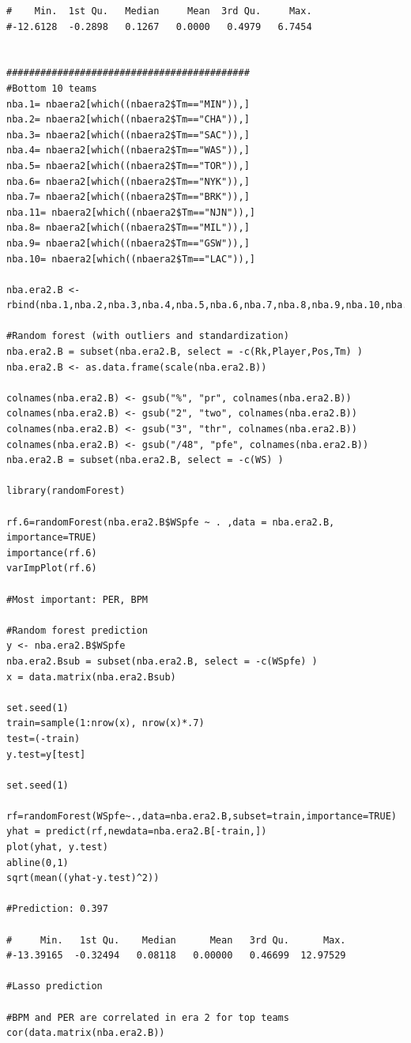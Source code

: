 \documentclass[11pt,letterpaper]{amsart}
\begin{document}
\begin{lstlisting}[breaklines]
#    Min.  1st Qu.   Median     Mean  3rd Qu.     Max. 
#-12.6128  -0.2898   0.1267   0.0000   0.4979   6.7454  


###########################################
#Bottom 10 teams
nba.1= nbaera2[which((nbaera2$Tm=="MIN")),]
nba.2= nbaera2[which((nbaera2$Tm=="CHA")),]
nba.3= nbaera2[which((nbaera2$Tm=="SAC")),]
nba.4= nbaera2[which((nbaera2$Tm=="WAS")),]
nba.5= nbaera2[which((nbaera2$Tm=="TOR")),]
nba.6= nbaera2[which((nbaera2$Tm=="NYK")),]
nba.7= nbaera2[which((nbaera2$Tm=="BRK")),]
nba.11= nbaera2[which((nbaera2$Tm=="NJN")),]
nba.8= nbaera2[which((nbaera2$Tm=="MIL")),]
nba.9= nbaera2[which((nbaera2$Tm=="GSW")),]
nba.10= nbaera2[which((nbaera2$Tm=="LAC")),]

nba.era2.B <- rbind(nba.1,nba.2,nba.3,nba.4,nba.5,nba.6,nba.7,nba.8,nba.9,nba.10,nba.11)

#Random forest (with outliers and standardization)
nba.era2.B = subset(nba.era2.B, select = -c(Rk,Player,Pos,Tm) )
nba.era2.B <- as.data.frame(scale(nba.era2.B))

colnames(nba.era2.B) <- gsub("%", "pr", colnames(nba.era2.B))
colnames(nba.era2.B) <- gsub("2", "two", colnames(nba.era2.B))
colnames(nba.era2.B) <- gsub("3", "thr", colnames(nba.era2.B))
colnames(nba.era2.B) <- gsub("/48", "pfe", colnames(nba.era2.B))
nba.era2.B = subset(nba.era2.B, select = -c(WS) )

library(randomForest)

rf.6=randomForest(nba.era2.B$WSpfe ~ . ,data = nba.era2.B, importance=TRUE)
importance(rf.6)
varImpPlot(rf.6)

#Most important: PER, BPM

#Random forest prediction
y <- nba.era2.B$WSpfe
nba.era2.Bsub = subset(nba.era2.B, select = -c(WSpfe) )
x = data.matrix(nba.era2.Bsub)

set.seed(1)
train=sample(1:nrow(x), nrow(x)*.7)
test=(-train)
y.test=y[test]

set.seed(1)

rf=randomForest(WSpfe~.,data=nba.era2.B,subset=train,importance=TRUE)
yhat = predict(rf,newdata=nba.era2.B[-train,])
plot(yhat, y.test)
abline(0,1)
sqrt(mean((yhat-y.test)^2))

#Prediction: 0.397

#     Min.   1st Qu.    Median      Mean   3rd Qu.      Max. 
#-13.39165  -0.32494   0.08118   0.00000   0.46699  12.97529 

#Lasso prediction

#BPM and PER are correlated in era 2 for top teams
cor(data.matrix(nba.era2.B))


\end{lstlisting}
\end{document}
